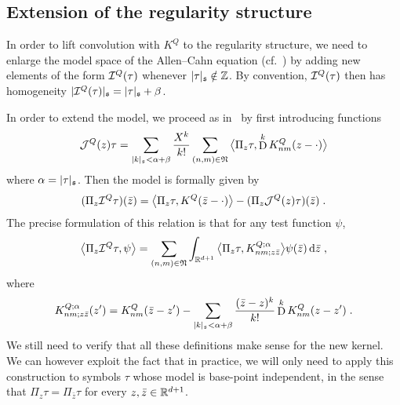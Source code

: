 \documentclass[reqno,11pt]{article}
\def\abss#1{\abs{#1}_\mathfrak{s}}
\DeclareMathOperator{\D}{D}            %
\newcommand{\setnm}{\mathfrak{N}}
\newcommand{\sumnm}{\sum_{(n,m)\in\setnm}}
\begin{document}

\subsection{Extension of the regularity structure}

In order to lift convolution with $K^Q$ to the regularity structure, we need to
enlarge the model space of the Allen--Cahn equation
(cf.~\cite[Sec.~3 and Table~1]{BK2016}) by adding new elements of the form
${\mathcal I}^Q(\tau)$ whenever $\abss{\tau}\notin\Z$. By convention, ${\mathcal I}^Q(\tau)$
then has homogeneity $\abss{\cI^Q(\tau)} = \abss{\tau} + \beta$. 

In order to extend the model, we proceed as in~\cite[Sect.~5]{Hairer2014} by
first introducing functions 
\begin{equation}
\label{eq:def_JQ} 
 \cJ^Q(z)\tau = \sum_{\abss{k} < \alpha+\beta} \frac{X^k}{k!}
 \sumnm \bigpscal{\Pi_z\tau}{\D^k K^Q_{nm}(z-\cdot)}
\end{equation} 
where $\alpha = \abss{\tau}$. Then the model is formally given by  
\begin{equation}
\label{eq:def_modelIQ} 
 (\Pi_z\cI^Q\tau)(\bar z) 
 = \bigpscal{\Pi_z\tau}{K^Q(\bar z-\cdot)} 
 - (\Pi_z\cJ^Q(z)\tau)(\bar z)\;.
\end{equation} 
The precise formulation of this relation is that for any test function $\psi$, 
\begin{equation}
\label{eq:def2_model_IQ} 
 \bigpscal{\Pi_z\cI^Q\tau}{\psi} 
 = \sumnm \int_{\R^{d+1}} \bigpscal{\Pi_z\tau}{K^{Q;\alpha}_{nm;z\bar z}}
\psi(\bar z)\6\bar z\;, 
\end{equation} 
where
\begin{equation}
\label{eq:def_KQalphanm} 
 K^{Q;\alpha}_{nm;z\bar z}(z')
 = K^Q_{nm}(\bar z-z') - \sum_{\abss{k} < \alpha+\beta}
 \frac{(\bar z-z)^k}{k!} \D^kK^Q_{nm}(z-z')\;.
\end{equation}
We still need to verify that all these definitions make sense for the new
kernel. We can however exploit the fact that in practice, we will only need to
apply this construction to symbols $\tau$ whose model is base-point independent,
in the sense that $\Pi_z\tau = \Pi_{\bar z}\tau$ for every $z, \bar
z\in\mathbb{R}^{d+1}$. 
\end{document}
